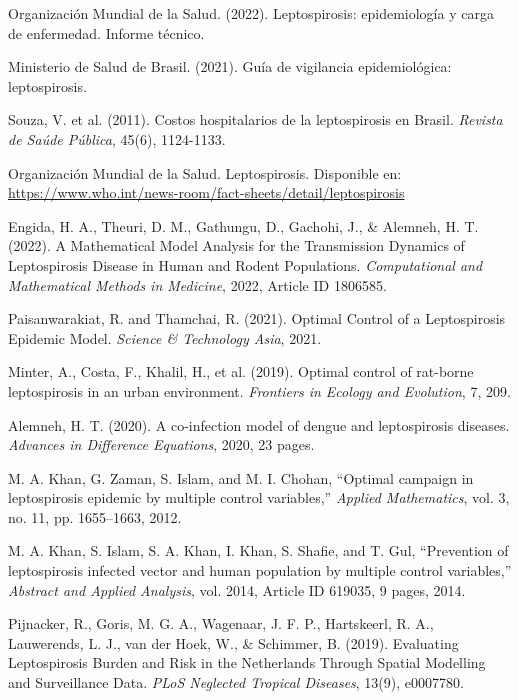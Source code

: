 \documentclass[12pt,a4paper]{article}
\begin{document}
\begin{thebibliography}{9}

Organización Mundial de la Salud. (2022). Leptospirosis: epidemiología y carga de enfermedad. Informe técnico.

Ministerio de Salud de Brasil. (2021). Guía de vigilancia epidemiológica: leptospirosis.

Souza, V. et al. (2011). Costos hospitalarios de la leptospirosis en Brasil. \textit{Revista de Saúde Pública}, 45(6), 1124-1133.

 Organización Mundial de la Salud. Leptospirosis. Disponible en: \url{https://www.who.int/news-room/fact-sheets/detail/leptospirosis}


Engida, H. A., Theuri, D. M., Gathungu, D., Gachohi, J., \& Alemneh, H. T. (2022).
A Mathematical Model Analysis for the Transmission Dynamics of Leptospirosis Disease in Human and Rodent Populations.
\textit{Computational and Mathematical Methods in Medicine}, 2022, Article ID 1806585.

Paisanwarakiat, R. and Thamchai, R. (2021).
Optimal Control of a Leptospirosis Epidemic Model.
\textit{Science \& Technology Asia}, 2021.

Minter, A., Costa, F., Khalil, H., et al. (2019).
Optimal control of rat-borne leptospirosis in an urban environment.
\textit{Frontiers in Ecology and Evolution}, 7, 209.

Alemneh, H. T. (2020).
A co-infection model of dengue and leptospirosis diseases.
\textit{Advances in Difference Equations}, 2020, 23 pages.

M. A. Khan, G. Zaman, S. Islam, and M. I. Chohan,
``Optimal campaign in leptospirosis epidemic by multiple control variables,''
\textit{Applied Mathematics}, vol. 3, no. 11, pp. 1655--1663, 2012.

M. A. Khan, S. Islam, S. A. Khan, I. Khan, S. Shafie, and T. Gul,
``Prevention of leptospirosis infected vector and human population by multiple control variables,''
\textit{Abstract and Applied Analysis}, vol. 2014, Article ID 619035, 9 pages, 2014.


Pijnacker, R., Goris, M. G. A., Wagenaar, J. F. P., Hartskeerl, R. A., Lauwerends, L. J., van der Hoek, W., \& Schimmer, B. (2019).
Evaluating Leptospirosis Burden and Risk in the Netherlands Through Spatial Modelling and Surveillance Data.
\textit{PLoS Neglected Tropical Diseases}, 13(9), e0007780.


\end{thebibliography}
\end{document}
